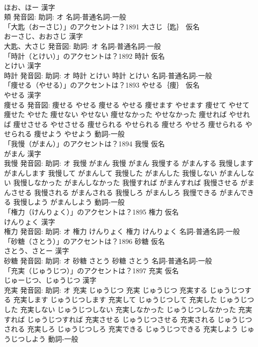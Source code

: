 \documentclass[8pt]{extreport}
\begin{document}
\begin{CJK}{UTF8}{min}
\\	ほお、ほー 漢字　
\\	頬 発音図: 助詞: オ							名詞-普通名詞-一般 
\\	「大匙（おーさじ）」のアクセントは？1891	大さじ｛匙｝ 仮名　
\\	おーさじ、おおさじ 漢字　
\\	大匙、大さじ 発音図: 助詞: オ							名詞-普通名詞-一般 
\\	「時計（とけい）」のアクセントは？1892	時計 仮名　
\\	とけい 漢字　
\\	時計 発音図: 助詞: オ	時計 とけい		時計 とけい				名詞-普通名詞-一般 
\\	「痩せる（やせる）」のアクセントは？1893	やせる｛痩｝ 仮名　
\\	やせる 漢字　
\\	痩せる 発音図:	痩せる やせる		痩せる やせる 痩せます やせます 痩せて やせて 痩せた やせた 痩せない やせない 痩せなかった やせなかった 痩せれば やせれば 痩せさせる やせさせる 痩せられる やせられる 痩せろ やせろ 痩せられる やせられる 痩せよう やせよう				動詞-一般 
\\	「我慢（がまん）」のアクセントは？1894	我慢 仮名　
\\	がまん 漢字　
\\	我慢 発音図: 助詞: オ	我慢 がまん		我慢 がまん 我慢する がまんする 我慢します がまんします 我慢して がまんして 我慢した がまんした 我慢しない がまんしない 我慢しなかった がまんしなかった 我慢すれば がまんすれば 我慢させる がまんさせる 我慢される がまんされる 我慢しろ がまんしろ 我慢できる がまんできる 我慢しよう がまんしよう				動詞-一般 
\\	「権力（けんりょく）」のアクセントは？1895	権力 仮名　
\\	けんりょく 漢字　
\\	権力 発音図: 助詞: オ	権力 けんりょく		権力 けんりょく				名詞-普通名詞-一般 
\\	「砂糖（さとう）」のアクセントは？1896	砂糖 仮名　
\\	さとう、さとー 漢字　
\\	砂糖 発音図: 助詞: オ	砂糖 さとう		砂糖 さとう				名詞-普通名詞-一般 
\\	「充実（じゅうじつ）」のアクセントは？1897	充実 仮名　
\\	じゅーじつ、じゅうじつ 漢字　
\\	充実 発音図: 助詞: オ	充実 じゅうじつ		充実 じゅうじつ 充実する じゅうじつする 充実します じゅうじつします 充実して じゅうじつして 充実した じゅうじつした 充実しない じゅうじつしない 充実しなかった じゅうじつしなかった 充実すれば じゅうじつすれば 充実させる じゅうじつさせる 充実される じゅうじつされる 充実しろ じゅうじつしろ 充実できる じゅうじつできる 充実しよう じゅうじつしよう				動詞-一般 

\end{CJK}
\end{document}
